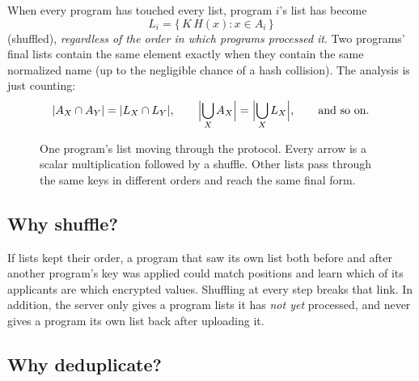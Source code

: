 \documentclass[11pt]{article}
\begin{document}
\noindent When every program has touched every list, program $i$'s list has become
\[
  L_i = \{\, K\, H(x) : x \in A_i \,\}
\]
(shuffled), \emph{regardless of the order in which programs processed it}. Two programs' final lists
contain the same element exactly when they contain the same normalized name (up to the negligible
chance of a hash collision). The analysis is just counting:
\[
  |A_X \cap A_Y| = |L_X \cap L_Y|, \qquad
  \Bigl|\bigcup_X A_X\Bigr| = \Bigl|\bigcup_X L_X\Bigr|, \qquad \text{and so on.}
\]

\begin{figure}[ht]
\centering
{}
\caption{One program's list moving through the protocol. Every arrow is a scalar multiplication
followed by a shuffle. Other lists pass through the same keys in different orders and reach the
same final form.}
\end{figure}

\subsection{Why shuffle?}

If lists kept their order, a program that saw its own list both before and after another program's
key was applied could match positions and learn which of its applicants are which encrypted values.
Shuffling at every step breaks that link. In addition, the server only gives a program lists it has
\emph{not yet} processed, and never gives a program its own list back after uploading it.

\subsection{Why deduplicate?}
\end{document}
